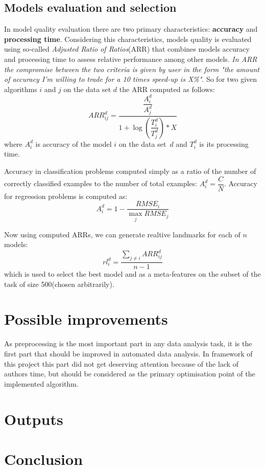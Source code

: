\documentclass[hidelinks, english]{mvi-report}
\begin{document}
\subsection{Models evaluation and selection}
In model quality evaluation there are two primary characteristics: \textbf{accuracy} and \textbf{processing time}.
Considering this characteristics, models quality is evaluated using so-called \textit{Adjusted Ratio of Ratios}(ARR)
that combines models accuracy and processing time to assess relative performance among other models. \textit{In ARR
the compromise between the two criteria is given by user in the form "the amount of accuracy I'm willing to trade for
a 10 times speed-up is X\%"}\cite{sampling-based-relative-landmarks}. So for two given algorithms $i$ and $j$ on
the data set $d$ the ARR computed as follows:
$$ ARR^d_{ij} = \dfrac{\dfrac{A^d_i}{A^d_j}}{1+\log{(\dfrac{T^d_i}{T^d_j})}*X} $$
where $A^d_i$ is accuracy of the model $i$ on the data set~$d$ and $T^d_i$ is its processing time.

Accuracy in classification problems computed simply as a ratio of the number of correctly classified examples to
the number of total examples: $ A^d_i = \dfrac{C}{N} $. Accuracy for regression problems is computed as:
$$ A^d_i = 1 - \dfrac{RMSE_i}{\max_{j}RMSE_j} $$

Now using computed ARRs, we can generate realtive landmarks for each of $n$ models:
$$ rl^d_i = \dfrac{\sum_{j \neq i}ARR^d_{ij}}{n - 1} $$
which is used to select the best model and as a meta-features on the subset of the task of size 500(chosen arbitrarily).

\section{Possible improvements}

As preprocessing is the most important part in any data analysis task\cite{ten-quick-tips}, it is the first part that
should be improved in automated data analysis. In framework of this project this part did not get deserving attention
because of the lack of authors time, but should be considered as the primary optimisation point of the implemented
algorithm.


\section{Outputs}



\section{Conclusion}


\end{document}
